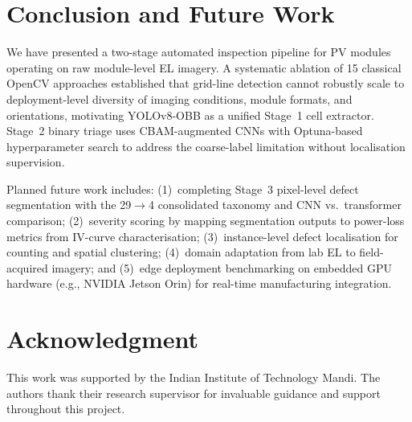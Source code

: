 \documentclass[conference]{IEEEtran}
\begin{document}
\section{Conclusion and Future Work}

We have presented a two-stage automated inspection pipeline for
PV modules operating on raw module-level EL imagery.
A systematic ablation of 15 classical OpenCV approaches
established that grid-line detection cannot robustly scale to
deployment-level diversity of imaging conditions, module
formats, and orientations, motivating YOLOv8-OBB as a unified
Stage~1 cell extractor.
Stage~2 binary triage uses CBAM-augmented CNNs with
Optuna-based hyperparameter search to address the coarse-label
limitation without localisation supervision.

Planned future work includes:
(1)~completing Stage~3 pixel-level defect segmentation with the
29$\to$4 consolidated taxonomy and CNN vs.\ transformer
comparison;
(2)~severity scoring by mapping segmentation outputs to
power-loss metrics from IV-curve characterisation;
(3)~instance-level defect localisation for counting and spatial
clustering;
(4)~domain adaptation from lab EL to field-acquired imagery;
and
(5)~edge deployment benchmarking on embedded GPU hardware
(e.g., NVIDIA Jetson Orin) for real-time manufacturing
integration.

\section*{Acknowledgment}

This work was supported by the Indian Institute of Technology
Mandi. The authors thank their research supervisor for
invaluable guidance and support throughout this project.
\end{document}
